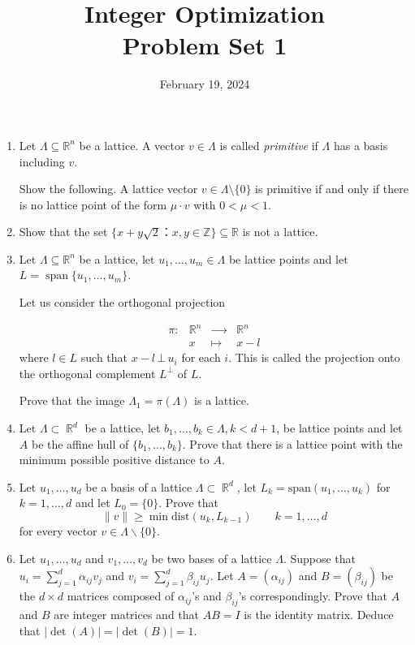 \documentclass[11pt,a4paper]{article}
\title{Integer Optimization  \\ Problem Set 1 }
\date{February 19, 2024}
\DeclareMathOperator{\Spa}{span}
\DeclareMathOperator{\RR}{\mathbb{R}}
\begin{document}
\maketitle 




\begin{enumerate} 
\item

  Let $Λ ⊆ ℝ^n$ be a lattice. A vector $v ∈ Λ$ is called \emph{primitive} if $Λ$ has a basis including $v$.

  \medskip

  Show the following. A lattice vector $v ∈ Λ \setminus \{0\}$ is primitive  if and only if there is no lattice point of the form $μ ⋅ v$ with $0<μ<1$.

\item Show that the set $ \{ x + y \sqrt{2} ： x,y ∈ ℤ \} ⊆ ℝ$ is not a lattice.

\item Let $Λ ⊆ ℝ^n$  be a lattice, let $u_1 ,\dots ,u_m  ∈ Λ$  be lattice points and let
  $ L = \Spa \{u_1, \dots , u_m\}$.


  Let us consider the orthogonal projection

  \begin{displaymath}
    \begin{array}{rccc}      
      π : & ℝ^ n &  ⟶ &  ℝ^ n \\
          & x & ↦       & x-l 
          \end{array}
        \end{displaymath}
where $l ∈ L$ such that  $x-l \, ⊥\,  u_i$ for each $i$.         
This is called the projection onto the orthogonal complement $L^⊥$ of $L$.

Prove that the image $Λ_1 = π(Λ)$  is a lattice.


\item Let $Λ ⊂ \RR^d$ be a lattice, let $b_1, \hdots ,b_k ∈ Λ, k < d+1$, be lattice points and let $A$ be the affine hull of $\{b_1, \hdots , b_k\}$. Prove that there is a lattice point with the minimum possible positive distance to $A$.

\item Let $u_1,\hdots ,u_d$ be a basis of a lattice $Λ ⊂ \RR^d$, let $L_k = \text{span}( u_1, \hdots ,u_k)$ for $k = 1, \hdots ,d$ and 
let $L_0 = \{0\}$. Prove that
$$∥v∥ ≥ \min \text{dist}(u_k, L_{k−1}) \qquad k=1,\hdots ,d$$
for every vector $v ∈ Λ \backslash \{0\}$.

\item Let $u_1, \hdots ,u_d$ and $v_1, \hdots ,v_d$ be two bases of a lattice $Λ$. Suppose that
$u_i = \sum_{j =1}^d α_{ij}v_j$ and $v_i = \sum_{j =1}^d β_{ij}u_j$. 
Let $A = (α_{ij})$ and $B = (β_{ij})$ be the $d × d$ matrices composed of $α_{ij}$’s and $β_{ij}$’s correspondingly. 
Prove that $A$ and $B$ are integer matrices and that $AB = I$ is the identity matrix. Deduce that $| \det(A)| = | \det(B)| = 1$.
  

  

\end{enumerate}



%
%


 
\end{document}
